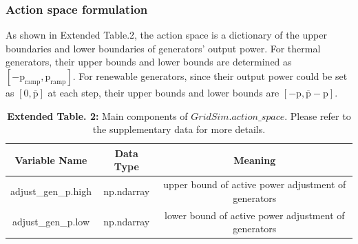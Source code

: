 \subsubsection*{Action space formulation}
As shown in Extended Table.2, the action space is a dictionary of the upper boundaries and lower boundaries of generators' output power. For thermal generators, their upper bounds and lower bounds are determined as $[-\text{p}_\text{ramp}, \text{p}_\text{ramp}]$. For renewable generators, since their output power could be set as $[0,\overline{\text{p}}]$ at each step, their upper bounds and lower bounds are $[-\text{p}, \overline{\text{p}}-\text{p}]$.
\begin{table}[h]
    \centering
    \begin{tiny}
    \begin{tabular}{ccc}
    \toprule
        Variable Name & Data Type & Meaning \\
    \midrule
        adjust\_gen\_p.high & np.ndarray & upper bound of active power adjustment of generators\\
        adjust\_gen\_p.low & np.ndarray & lower bound of active power adjustment of generators\\
    \bottomrule
    \end{tabular}
    \captionsetup{labelformat=empty}
    \caption{\textbf{Extended Table. 2:} Main components of $GridSim.action\_space$. Please refer to the supplementary data for more details.}
    \end{tiny}
    \label{tab:observation}
\end{table}

